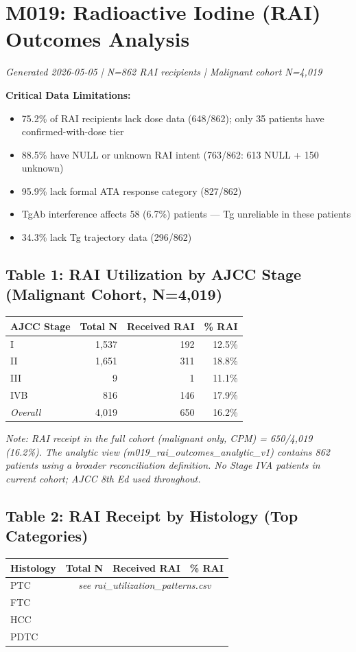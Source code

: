 \documentclass{article}
\begin{document}
\section*{M019: Radioactive Iodine (RAI) Outcomes Analysis}
\textit{Generated 2026-05-05 | N=862 RAI recipients | Malignant cohort N=4,019}

\bigskip
\noindent\textbf{Critical Data Limitations:}
\begin{itemize}
  \item 75.2\% of RAI recipients lack dose data (648/862); only 35 patients have confirmed-with-dose tier
  \item 88.5\% have NULL or unknown RAI intent (763/862: 613 NULL + 150 unknown)
  \item 95.9\% lack formal ATA response category (827/862)
  \item TgAb interference affects 58 (6.7\%) patients --- Tg unreliable in these patients
  \item 34.3\% lack Tg trajectory data (296/862)
\end{itemize}

\subsection*{Table 1: RAI Utilization by AJCC Stage (Malignant Cohort, N=4,019)}
\begin{tabular}{lrrr}
\toprule
AJCC Stage & Total N & Received RAI & \% RAI \\
\midrule
I   & 1,537 & 192 & 12.5\% \\
II  & 1,651 & 311 & 18.8\% \\
III &     9 &   1 & 11.1\% \\
IVB &   816 & 146 & 17.9\% \\
\midrule
\textit{Overall} & 4,019 & 650 & 16.2\% \\
\bottomrule
\end{tabular}

\vspace{0.3cm}
\noindent\textit{Note: RAI receipt in the full cohort (malignant only, CPM) = 650/4,019 (16.2\%).
The analytic view (m019\_rai\_outcomes\_analytic\_v1) contains 862 patients using a broader reconciliation definition.
No Stage IVA patients in current cohort; AJCC 8th Ed used throughout.}

\subsection*{Table 2: RAI Receipt by Histology (Top Categories)}
\begin{tabular}{lrrr}
\toprule
Histology & Total N & Received RAI & \% RAI \\
\midrule
PTC         & \multicolumn{3}{c}{\textit{see rai\_utilization\_patterns.csv}} \\
FTC         & & & \\
HCC         & & & \\
PDTC        & & & \\
\bottomrule
\end{tabular}
\end{document}
